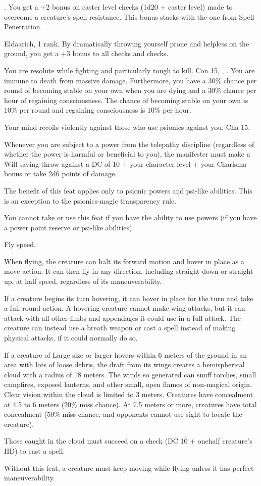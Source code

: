 {.}
{You get a +2 bonus on caster level checks (1d20 + caster level) made to overcome a creature's spell resistance. This bonus stacks with the one from Spell Penetration.}

{Eldaarich,  1 rank.}
{By dramatically throwing yourself prone and helpless on the ground, you get a +3 bonus to all  checks and  checks.}

{You are resolute while fighting and particularly tough to kill.}
{Con 15, , .}
{You are immune to death from massive damage. Furthermore, you have a 30\% chance per round of becoming stable on your own when you are dying and a 30\% chance per hour of regaining consciousness.}
{The chance of becoming stable on your own is 10\% per round and regaining consciousness is 10\% per hour.}{}

{Your mind recoils violently against those who use psionics against you.}
{Cha 15.}
{Whenever you are subject to a power from the telepathy discipline (regardless of whether the power is harmful or beneficial to you), the manifester must make a Will saving throw against a DC of 10 + \onehalf your character level + your Charisma bonus or take 2d6 points of damage.

The benefit of this feat applies only to psionic powers and psi-like abilities. This is an exception to the psionics-magic transparency rule.}{}
{You cannot take or use this feat if you have the ability to use powers (if you have a power point reserve or psi-like abilities).}

{}
{Fly speed.}
{When flying, the creature can halt its forward motion and hover in place as a move action. It can then fly in any direction, including straight down or straight up, at half speed, regardless of its maneuverability.

If a creature begins its turn hovering, it can hover in place for the turn and take a full-round action. A hovering creature cannot make wing attacks, but it can attack with all other limbs and appendages it could use in a full attack. The creature can instead use a breath weapon or cast a spell instead of making physical attacks, if it could normally do so.

If a creature of Large size or larger hovers within 6 meters of the ground in an area with lots of loose debris, the draft from its wings creates a hemispherical cloud with a radius of 18 meters. The winds so generated can snuff torches, small campfires, exposed lanterns, and other small, open flames of non-magical origin. Clear vision within the cloud is limited to 3 meters. Creatures have concealment at 4.5 to 6 meters (20\% miss chance). At 7.5 meters or more, creatures have total concealment (50\% miss chance, and opponents cannot use sight to locate the creature).

Those caught in the cloud must succeed on a  check (DC 10 + onehalf creature's HD) to cast a spell.}
{Without this feat, a creature must keep moving while flying unless it has perfect maneuverability.}
{}

